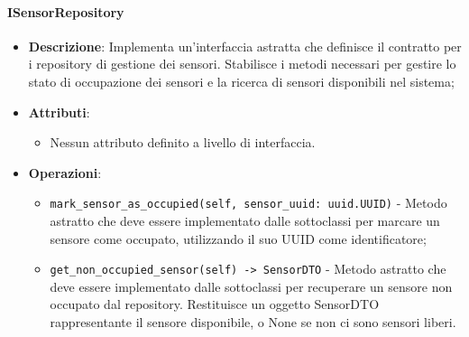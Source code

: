 \documentclass[10pt]{article}
\begin{document}
    \paragraph{ISensorRepository}
    \begin{itemize} 
    \item \textbf{Descrizione}: Implementa un'interfaccia astratta che definisce il contratto per i repository di gestione dei sensori. Stabilisce i metodi necessari per gestire lo stato di occupazione dei sensori e la ricerca di sensori disponibili nel sistema;
    \item \textbf{Attributi}:
    \begin{itemize}
        \item Nessun attributo definito a livello di interfaccia.
    \end{itemize}
    
    \item \textbf{Operazioni}:
    \begin{itemize}
        \item \texttt{mark\_sensor\_as\_occupied(self, sensor\_uuid: uuid.UUID)} - Metodo astratto che deve essere implementato dalle sottoclassi per marcare un sensore come occupato, utilizzando il suo UUID come identificatore;
        
        \item \texttt{get\_non\_occupied\_sensor(self) -> SensorDTO} - Metodo astratto che deve essere implementato dalle sottoclassi per recuperare un sensore non occupato dal repository. Restituisce un oggetto SensorDTO rappresentante il sensore disponibile, o None se non ci sono sensori liberi.
    \end{itemize}
    \end{itemize}

    
\end{document}
